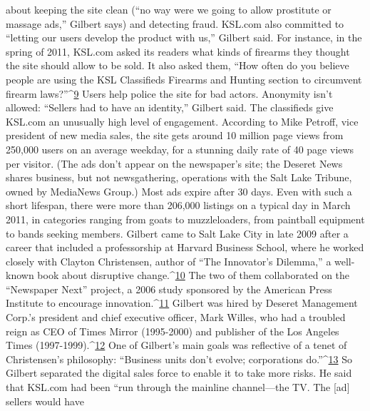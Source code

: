 about keeping the site clean (``no way were we going to allow prostitute or massage
ads,'' Gilbert says) and detecting fraud.
KSL.com also committed to ``letting our users develop the product with us,''
Gilbert said. For instance, in the spring of 2011, KSL.com asked its readers what
kinds of firearms they thought the site should allow to be sold. It also asked them,
``How often do you believe people are using the KSL Classifieds Firearms and
Hunting section to circumvent firearm laws?''^{\href{#endnotes-chapter-8}{9}} Users help police the site for bad
actors. Anonymity isn't allowed: ``Sellers had to have an identity,'' Gilbert said.
The classifieds give KSL.com an unusually high level of engagement. According
to Mike Petroff, vice president of new media sales, the site gets around 10
million page views from 250,000 users on an average weekday, for a stunning
daily rate of 40 page views per visitor. (The ads don't appear on the newspaper's
site; the Deseret News shares business, but not newsgathering, operations with
the Salt Lake Tribune, owned by MediaNews Group.)
Most ads expire after 30 days. Even with such a short lifespan, there were more
than 206,000 listings on a typical day in March 2011, in categories ranging from
goats to muzzleloaders, from paintball equipment to bands seeking members.
Gilbert came to Salt Lake City in late 2009 after a career that included a professorship
at Harvard Business School, where he worked closely with Clayton
Christensen, author of ``The Innovator's Dilemma,'' a well-known book about
disruptive change.^{\href{#endnotes-chapter-8}{10}} The two of them collaborated on the ``Newspaper Next''
project, a 2006 study sponsored by the American Press Institute to encourage
innovation.^{\href{#endnotes-chapter-8}{11}} Gilbert was hired by Deseret Management Corp.'s president and
chief executive officer, Mark Willes, who had a troubled reign as CEO of Times
Mirror (1995-2000) and publisher of the Los Angeles Times (1997-1999).^{\href{#endnotes-chapter-8}{12}}
One of Gilbert's main goals was reflective of a tenet of Christensen's philosophy:
``Business units don't evolve; corporations do.''^{\href{#endnotes-chapter-8}{13}} So Gilbert separated
the digital sales force to enable it to take more risks. He said that KSL.com had
been ``run through the mainline channel—the TV. The [ad] sellers would have

